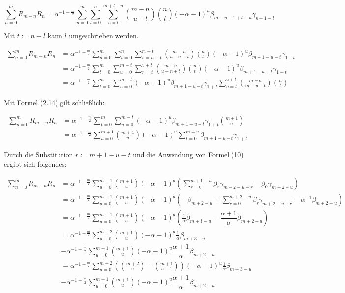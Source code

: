 \documentclass[a4paper, 11pt]{scrreprt}
\begin{document}
\[\sum_{n=0}^m R_{m-n} R_n = \alpha^{-1-\frac{m}{2}} \sum_{n=0}^m \sum_{l=0}^n \sum_{u=l}^{m+l-n} \binom{m-n}{u-l}  \binom{n}{l} (-\alpha -1)^u \beta_{m-n+1+l-u} \gamma_{n+1-l}\]

Mit $t:=n-l$ kann $l$ umgeschrieben werden.

\begin{align*}
\sum_{n=0}^m R_{m-n} R_n 
&= \alpha^{-1-\frac{m}{2}} \sum_{n=0}^m \sum_{t=0}^n \sum_{u=n-t}^{m-t} \binom{m-n}{u-n+t}  \binom{n}{t} (-\alpha -1)^u \beta_{m+1-u-t} \gamma_{1+t} \\
&= \alpha^{-1-\frac{m}{2}} \sum_{t=0}^m \sum_{u=0}^{m-t} \sum_{n=t}^{u+t} \binom{m-n}{u-n+t}  \binom{n}{t} (-\alpha -1)^u \beta_{m+1-u-t} \gamma_{1+t} \\
&= \alpha^{-1-\frac{m}{2}} \sum_{t=0}^{m} \sum_{u=0}^{m-t} (-\alpha -1)^u \beta_{m+1-u-t} \gamma_{1+t} \sum_{n=t}^{u+t} \binom{m-n}{m-u-t}  \binom{n}{t}
\end{align*}

Mit Formel (2.14) gilt schließlich:

\begin{align*}
\sum_{n=0}^m R_{m-n} R_n 
&= \alpha^{-1-\frac{m}{2}} \sum_{t=0}^m \sum_{u=0}^{m-t} (-\alpha -1)^u \beta_{m+1-u-t} \gamma_{1+t} \binom{m+1}{u} \\
&= \alpha^{-1-\frac{m}{2}} \sum_{u=0}^{m+1} \binom{m+1}{u} (-\alpha -1)^u \sum_{t=0}^{m-u} \beta_{m+1-u-t} \gamma_{1+t}
\end{align*}

Durch die Substitution $r := m+1-u-t$ und die Anwendung von Formel (10) ergibt sich folgendes:

\begin{align*}
\sum_{n=0}^m R_{m-n} R_n
&= \alpha^{-1-\frac{m}{2}} \sum_{u=0}^{m+1} \binom{m+1}{u} (-\alpha -1)^u \left( \sum_{r=0}^{m+1-u} \beta_r \gamma_{m+2-u-r} - \beta_0 \gamma_{m+2-u} \right) \\
&= \alpha^{-1-\frac{m}{2}} \sum_{u=0}^{m+1} \binom{m+1}{u} (-\alpha -1)^u \left( - \beta_{m+2-u} + \sum_{r=0}^{m+2-u} \beta_r \gamma_{m+2-u-r} - \alpha^{-1} \beta_{m+2-u}\right) \\
&= \alpha^{-1-\frac{m}{2}} \sum_{u=0}^{m+1} \binom{m+1}{u} (-\alpha -1)^u \left(\frac{1}{\alpha} \beta_{m+3-u} - \dfrac{\alpha +1}{\alpha}\beta_{m+2-u} \right) \\
&= \alpha^{-1-\frac{m}{2}} \sum_{u=0}^{m+2} \binom{m+1}{u} (-\alpha -1)^u \frac{1}{\alpha} \beta_{m+3-u} \\
&- \alpha^{-1-\frac{m}{2}} \sum_{u=0}^{m+1} \binom{m+1}{u} (-\alpha -1)^u \dfrac{\alpha +1}{\alpha}\beta_{m+2-u} \\
&= \alpha^{-1-\frac{m}{2}} \sum_{u=0}^{m+2} \left( \binom{m+2}{u} -\binom{m+1}{u-1} \right) (-\alpha -1)^u \frac{1}{\alpha} \beta_{m+3-u} \\
&- \alpha^{-1-\frac{m}{2}} \sum_{u=0}^{m+1} \binom{m+1}{u} (-\alpha -1)^u \dfrac{\alpha +1}{\alpha}\beta_{m+2-u} \\
\end{align*}
\end{document}
